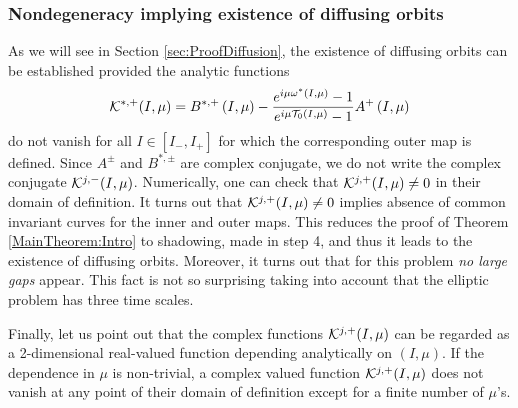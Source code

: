 \subsubsection{Nondegeneracy implying existence of diffusing orbits}
As we will see in Section \ref{sec:ProofDiffusion}, the existence of
diffusing orbits can be established provided the analytic functions
\[
\mathcal{K}^{\ast,+}(I,\mu)=B^{\ast,+} \left(I,\mu\right)-
\frac{e^{ i\mu\omega^\ast(I,\mu)}-1}{e^{ i\mu\mathcal{T}_0(I,\mu)}-1}A^+ \left( I,\mu\right)
\]
do not vanish for  all $I\in[I_-,I_+]$ for which the  corresponding
outer map is defined. Since $A^\pm$ and $B^{\ast,\pm}$ are complex conjugate,
we do not write the complex conjugate $\mathcal{K}^{j,-}(I,\mu)$.
Numerically, one can check that  $\mathcal{K}^{j,+}(I,\mu)\neq 0$ in their domain
of definition. It turns out that $\mathcal{K}^{j,+}(I,\mu)\neq 0$ implies absence of common
invariant curves for the inner and outer maps. This reduces the proof of Theorem \ref{MainTheorem:Intro}
to shadowing, made in step 4, and thus it leads to the existence 
of diffusing orbits. Moreover, it turns out that for this problem 
{\it no  large gaps} appear. This fact is not so surprising taking
into account that  the elliptic problem has three time scales.

Finally, let us point out that the complex functions  $\mathcal{K}^{j,+}(I,\mu)$  can be regarded as
a 2-dimensional real-valued function depending analytically on $(I,\mu)$.
If the dependence in $\mu$ is non-trivial, 
a complex valued function $\mathcal{K}^{j,+}(I,\mu)$ does not vanish at 
any point of their domain of definition except for a finite number of $\mu$'s.





